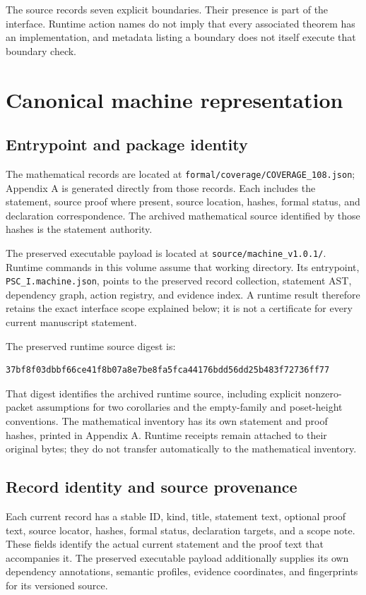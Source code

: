 \documentclass[a4paper,11pt]{article}
\begin{document}
The source records seven explicit boundaries. Their presence is part of the interface. Runtime action names do not imply that every associated theorem has an implementation, and metadata listing a boundary does not itself execute that boundary check.

\section{Canonical machine representation}
\subsection{Entrypoint and package identity}
The mathematical records are located at \nolinkurl{formal/coverage/COVERAGE_108.json}; Appendix A is generated directly from those records. Each includes the statement, source proof where present, source location, hashes, formal status, and declaration correspondence. The archived mathematical source identified by those hashes is the statement authority.

The preserved executable payload is located at \nolinkurl{source/machine_v1.0.1/}. Runtime commands in this volume assume that working directory. Its entrypoint, \nolinkurl{PSC_I.machine.json}, points to the preserved record collection, statement AST, dependency graph, action registry, and evidence index. A runtime result therefore retains the exact interface scope explained below; it is not a certificate for every current manuscript statement.

The preserved runtime source digest is:
\begin{lstlisting}
37bf8f03dbbf66ce41f8b07a8e7be8fa5fca44176bdd56dd25b483f72736ff77
\end{lstlisting}
That digest identifies the archived runtime source, including explicit nonzero-packet assumptions for two corollaries and the empty-family and poset-height conventions. The mathematical inventory has its own statement and proof hashes, printed in Appendix A. Runtime receipts remain attached to their original bytes; they do not transfer automatically to the mathematical inventory.
\subsection{Record identity and source provenance}
Each current record has a stable ID, kind, title, statement text, optional proof text, source locator, hashes, formal status, declaration targets, and a scope note. These fields identify the actual current statement and the proof text that accompanies it. The preserved executable payload additionally supplies its own dependency annotations, semantic profiles, evidence coordinates, and fingerprints for its versioned source.
\end{document}
